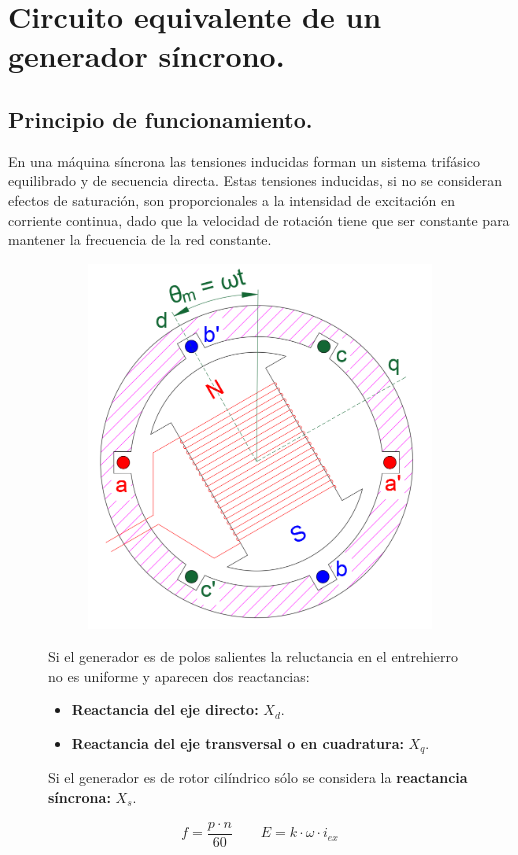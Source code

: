 	\section{Circuito equivalente de un generador síncrono.}
		\subsection{Principio de funcionamiento.}
			En una máquina síncrona las tensiones inducidas forman un sistema trifásico equilibrado y de secuencia directa. Estas tensiones inducidas, si no se consideran efectos de saturación, son proporcionales a la intensidad de excitación en corriente continua, dado que la velocidad de rotación tiene que ser constante para mantener la frecuencia de la red constante.
			
			
			\begin{figure}[H]
				\begin{minipage}{0.5\textwidth}
					\begin{figure}[H]
						\centering
						\includegraphics[width=0.7\linewidth]{res/tema6/ejes_dq}
						\label{fig:ejesdq}
					\end{figure}
				\end{minipage}
				\begin{minipage}{0.5\textwidth}
					Si el generador es de polos salientes la reluctancia en el entrehierro no es uniforme y aparecen dos reactancias:
					\begin{itemize}
						\item \textbf{Reactancia del eje directo:} $X_d$.
						\item \textbf{Reactancia del eje transversal o en cuadratura:} $X_q$.
					\end{itemize}
					Si el generador es de rotor cilíndrico sólo se considera la \textbf{reactancia síncrona:} $X_s$.
					
					\[f = \dfrac{p\cdot n}{60} \qquad E = k\cdot \omega \cdot i_{ex}\]
				\end{minipage}
			\end{figure}
			
